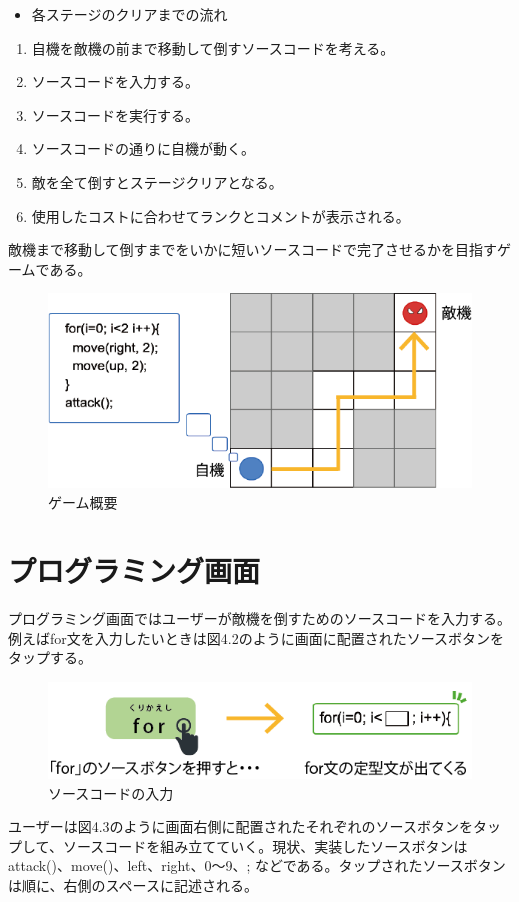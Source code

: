 \documentclass[openany,11pt,papersize]{jsbook}
\begin{document}
\begin{itemize}
\item 各ステージのクリアまでの流れ
\end{itemize}
\begin{enumerate}
\item 自機を敵機の前まで移動して倒すソースコードを考える。
\item ソースコードを入力する。
\item ソースコードを実行する。
\item ソースコードの通りに自機が動く。
\item 敵を全て倒すとステージクリアとなる。
\item 使用したコストに合わせてランクとコメントが表示される。
\end{enumerate}
\par 敵機まで移動して倒すまでをいかに短いソースコードで完了させるかを目指すゲームである。

\begin{figure}[h]
\begin{center}
\includegraphics[width=12cm, bb=0 0 573 263]{img/4thParagraph/game.png}
\end{center}
\caption{ゲーム概要}
\end{figure}


\section{プログラミング画面}
プログラミング画面ではユーザーが敵機を倒すためのソースコードを入力する。例えばfor文を入力したいときは図4.2のように画面に配置されたソースボタンをタップする。

\begin{figure}[H]
\begin{center}
\includegraphics[width=12cm, bb=0 0 564 129]{img/4thParagraph/forButton.png}
\end{center}
\caption{ソースコードの入力}
\end{figure}
ユーザーは図4.3のように画面右側に配置されたそれぞれのソースボタンをタップして、ソースコードを組み立てていく。現状、実装したソースボタンはattack()、move()、left、right、0〜9、;  などである。タップされたソースボタンは順に、右側のスペースに記述される。
\end{document}
